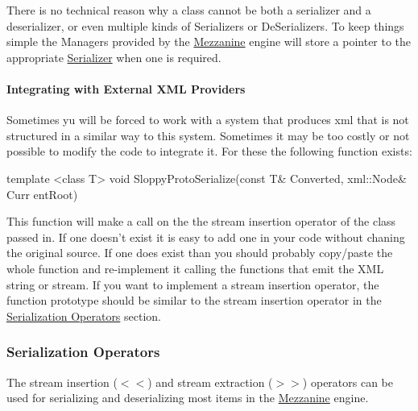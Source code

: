  \par
 There is no technical reason why a class cannot be both a serializer and a deserializer, or even multiple kinds of Serializers or DeSerializers. To keep things simple the Managers provided by the \hyperlink{namespaceMezzanine}{Mezzanine} engine will store a pointer to the appropriate \hyperlink{classMezzanine_1_1Serializer}{Serializer} when one is required. \hypertarget{Serialization_serializationlegacy}{}\paragraph{Integrating with External XML Providers}\label{Serialization_serializationlegacy}
Sometimes yu will be forced to work with a system that produces xml that is not structured in a similar way to this system. Sometimes it may be too costly or not possible to modify the code to integrate it. For these the following function exists: 
\begin{DoxyCode}
 template <class T> void SloppyProtoSerialize(const T& Converted, xml::Node& Curr
      entRoot)
\end{DoxyCode}
 This function will make a call on the the stream insertion operator of the class passed in. If one doesn't exist it is easy to add one in your code without chaning the original source. If one does exist than you should probably copy/paste the whole function and re-\/implement it calling the functions that emit the XML string or stream. If you want to implement a stream insertion operator, the function prototype should be similar to the stream insertion operator in the \hyperlink{Serialization_serializationoperators}{Serialization Operators} section. \hypertarget{Serialization_serializationoperators}{}\subsubsection{Serialization Operators}\label{Serialization_serializationoperators}
The stream insertion ($<$$<$) and stream extraction ($>$$>$) operators can be used for serializing and deserializing most items in the \hyperlink{namespaceMezzanine}{Mezzanine} engine.


